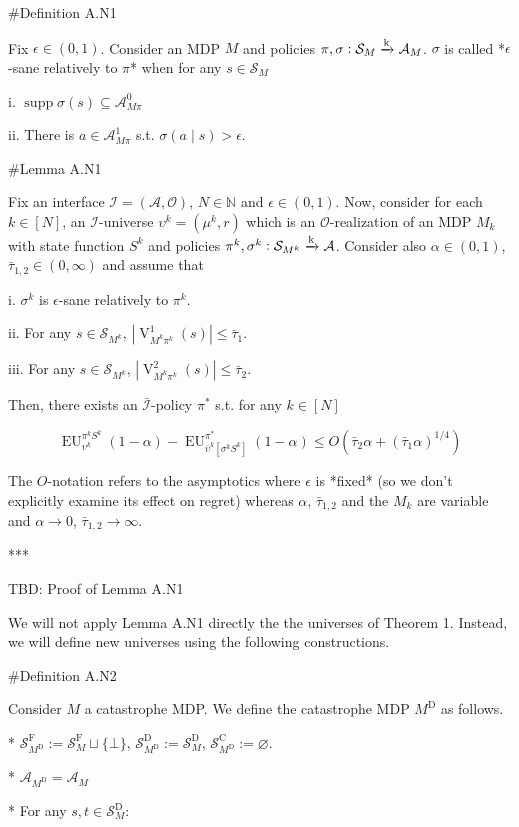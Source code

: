 \documentclass[a4paper]{article}
\DeclareMathOperator{\Supp}{supp}
\newcommand{\AP}[1]{\left(#1\right)}
\newcommand{\AB}[1]{\left[#1\right]}
\newcommand{\Nats}{\mathbb{N}}
\newcommand{\Abs}[1]{\left\vert #1 \right\vert}
\newcommand{\M}{\xrightarrow{\textnormal{k}}}
\newcommand{\Ob}{\mathcal{O}}
\newcommand{\A}{\mathcal{A}}
\newcommand{\St}{\mathcal{S}}
\newcommand{\In}{\mathcal{I}}
\newcommand{\Adi}{{\bar{\In}}}
\newcommand{\RMC}{\mathrm{C}}
\newcommand{\RMD}{\mathrm{D}}
\newcommand{\RMF}{\mathrm{F}}
\newcommand{\SF}{\St^{\RMF}}
\newcommand{\SD}{\St^{\RMD}}
\newcommand{\SC}{\St^{\RMC}}
\newcommand{\MD}{M^{\RMD}}
\newcommand{\V}{\operatorname{V}}
\newcommand{\EU}{\operatorname{EU}}
\begin{document}
\#Definition A.N1

Fix $\epsilon\in(0,1)$. Consider an MDP $M$ and policies $\pi,\sigma: \St_M \M \A_M$. $\sigma$ is called *$\epsilon$-sane relatively to $\pi$* when for any $s \in \St_M$

i. $\Supp{\sigma(s)} \subseteq \A_{M\pi}^0$

ii. There is $a \in \A_{M\pi}^1$ s.t. $\sigma(a \mid s) > \epsilon$.

\#Lemma A.N1

Fix an interface $\In=(\A,\Ob)$, $N \in \Nats$ and $\epsilon \in (0,1)$. Now, consider for each $k \in [N]$, an $\In$-universe $\upsilon^k=(\mu^k,r)$ which is an $\Ob$-realization of an MDP $M_k$ with state function $S^k$ and policies $\pi^k,\sigma^k: \St_{M^k} \M \A$. Consider also $\alpha\in(0,1)$, $\bar{\tau}_{1,2} \in (0,\infty)$ and assume that 

i. $\sigma^k$ is $\epsilon$-sane relatively to $\pi^k$.

ii. For any $s \in \St_{M^k}$, $\Abs{\V^1_{M^k\pi^k}(s)} \leq \bar{\tau}_1$.

iii. For any $s \in \St_{M^k}$, $\Abs{\V^2_{M^k\pi^k}(s)} \leq \bar{\tau}_2$.

Then, there exists an $\Adi$-policy $\pi^*$ s.t. for any $k \in [N]$

$$\EU_{\upsilon^k}^{\pi^k S^k}(1-\alpha) - \EU_{\bar{\upsilon}^k\AB{\sigma^k S^k}}^{\pi^*}(1-\alpha) \leq O\AP{\bar{\tau}_2 \alpha + (\bar{\tau}_1 \alpha)^{1/4}}$$

The $O$-notation refers to the asymptotics where $\epsilon$ is *fixed* (so we don't explicitly examine its effect on regret) whereas $\alpha$, $\bar{\tau}_{1,2}$ and the $M_k$ are variable and $\alpha \rightarrow 0$, $\bar{\tau}_{1,2} \rightarrow \infty$.

***

TBD: Proof of Lemma A.N1 %

We will not apply Lemma A.N1 directly the the universes of Theorem 1. Instead, we will define new universes using the following constructions.

\#Definition A.N2

Consider $M$ a catastrophe MDP. We define the catastrophe MDP $\MD$ as follows.

* $\SF_{\MD}:=\SF_M \sqcup \{\bot\}$, $\SD_{\MD}:=\SD_M$, $\SC_{\MD}:=\varnothing$.

* $\A_{\MD} = \A_M$

* For any $s,t \in \SD_M$:
\end{document}
